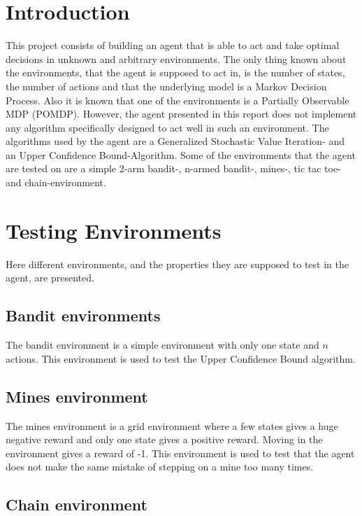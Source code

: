 \documentclass[11pt]{article}
\numberwithin{equation}{section}
\begin{document}
\begin{flushleft}

\section{Introduction}

This project consists of building an agent that is able to act and take optimal decisions in unknown and arbitrary environments. The only thing known about the environments, that the agent is supposed to act in, is the number of states, the number of actions and that the underlying model is a Markov Decision Process. Also it is known that one of the environments is a Partially Observable MDP (POMDP). However, the agent presented in this report does not implement any algorithm specifically designed to act well in such an environment. The algorithms used by the agent are a Generalized Stochastic Value Iteration- and an Upper Confidence Bound-Algorithm. Some of the environments that the agent are tested on are a simple 2-arm bandit-, n-armed bandit-, mines-, tic tac toe- and chain-environment.

\section{Testing Environments}

Here different environments, and the properties they are supposed to test in the agent, are presented.

\subsection{Bandit environments}

The bandit environment is a simple environment with only one state and $n$ actions. This environment is used to test the Upper Confidence Bound algorithm.
\subsection{Mines environment}
The mines environment is a grid environment where a few states gives a huge negative reward and only one state gives a positive reward. Moving in the environment gives a reward of -1. This environment is used to test that the agent does not make the same mistake of stepping on a mine too many times.

\subsection{Chain environment}


\end{flushleft}
\end{document}
